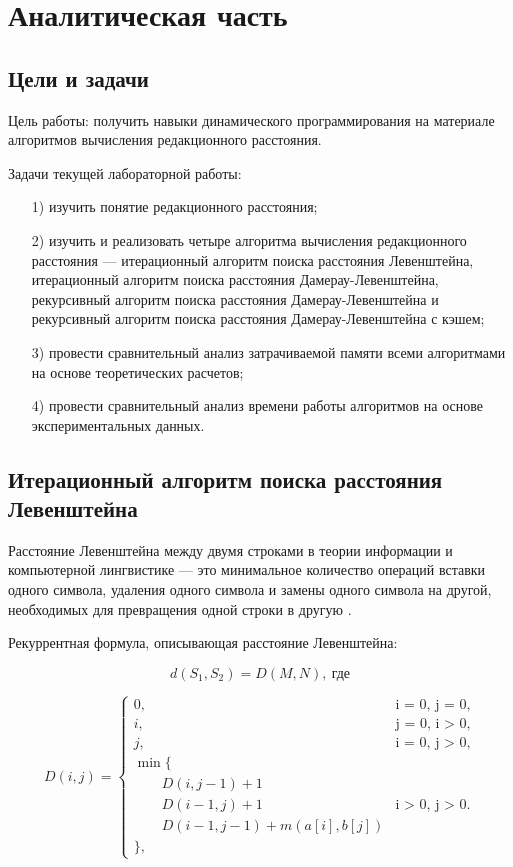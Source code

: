 \chapter{Аналитическая часть}

\section{Цели и задачи}

Цель работы: получить навыки динамического программирования на материале алгоритмов вычисления редакционного расстояния.

Задачи текущей лабораторной работы:

\begin{enumerate}
\item[1)] изучить понятие редакционного расстояния;
\item[2)] изучить и реализовать четыре алгоритма вычисления редакционного расстояния --- итерационный алгоритм поиска расстояния Левенштейна, итерационный алгоритм поиска расстояния Дамерау-Левенштейна, рекурсивный алгоритм поиска расстояния Дамерау-Левенштейна и рекурсивный алгоритм поиска расстояния Дамерау-Левенштейна с кэшем;
\item[3)] провести сравнительный анализ затрачиваемой памяти всеми алгоритмами на основе теоретических расчетов;
\item[4)]
провести сравнительный анализ времени работы алгоритмов на основе экспериментальных данных.
\end{enumerate}

\section{Итерационный алгоритм поиска расстояния Левенштейна}

Расстояние Левенштейна между двумя строками в теории информации и компьютерной лингвистике --- это минимальное количество операций вставки одного символа, удаления одного символа и замены одного символа на другой, необходимых для превращения одной строки в другую \cite{Leschenko2018}.

Рекуррентная формула, описывающая расстояние Левенштейна:

\begin{equation}
d(S_1, S_2) = D(M, N),~\text{где}
\end{equation}

\begin{equation}
	\label{eq:D}
	D(i, j) = \begin{cases}
		0, &\text{i = 0, j = 0,}\\
		i, &\text{j = 0, i > 0,}\\
		j, &\text{i = 0, j > 0,}\\
		\min \lbrace \\
		\qquad D(i, j-1) + 1\\
		\qquad D(i-1, j) + 1 &\text{i > 0, j > 0.}\\
		\qquad D(i-1, j-1) + m(a[i], b[j]) \\
		\rbrace,
	\end{cases}
\end{equation}

